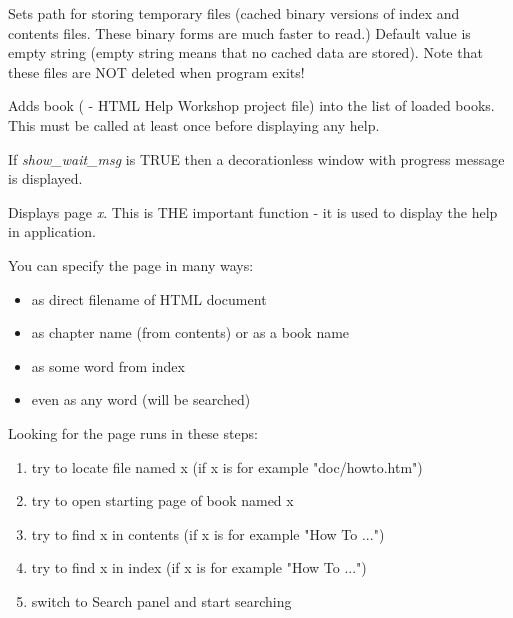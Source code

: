 
Sets path for storing temporary files (cached binary versions of index and contents files. These binary
forms are much faster to read.) Default value is empty string (empty string means
that no cached data are stored). Note that these files are NOT
deleted when program exits!

\label{wxhtmlhelpcontrolleraddbook}


Adds book ( - HTML Help Workshop project file) into the list of loaded books.
This must be called at least once before displaying  any help.

If {\it show_wait_msg} is TRUE then a decorationless window with progress message is displayed.

\label{wxhtmlhelpcontrollerdisplay}


Displays page {\it x}. This is THE important function - it is used to display
the help in application.

You can specify the page in many ways:

\begin{itemize}
\item as direct filename of HTML document
\item as chapter name (from contents) or as a book name
\item as some word from index
\item even as any word (will be searched) 
\end{itemize}

Looking for the page runs in these steps:

\begin{enumerate}
\item try to locate file named x (if x is for example "doc/howto.htm")
\item try to open starting page of book named x
\item try to find x in contents (if x is for example "How To ...")
\item try to find x in index (if x is for example "How To ...")
\item switch to Search panel and start searching
\end{enumerate}

